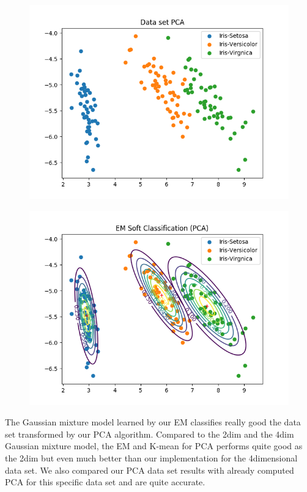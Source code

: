 \documentclass[a4paper]{article}
\begin{document}
\begin{figure}[htp]
\centering
\begin{minipage}{0.4\textwidth}
  \includegraphics[scale=0.5]{plots/basic_scenario3_cmpnt3.png}
  \label{fig:16}
\end{minipage}
\hfill
\begin{minipage}{0.4\textwidth}
  \includegraphics[scale=0.5]{plots/soft_classification_scenario3_cmpnt3.png}
  \label{fig:17}
\end{minipage}
\end{figure} 

\noindent
The Gaussian mixture model learned by our EM classifies really good the data set transformed by our PCA algorithm. Compared to the 2dim and the 4dim Gaussian mixture model, the EM and K-mean for PCA performs quite good as the 2dim but even much better than our implementation for the 4dimensional data set. We also compared our PCA data set results with already computed PCA for this specific data set and are quite accurate. 
\end{document}
